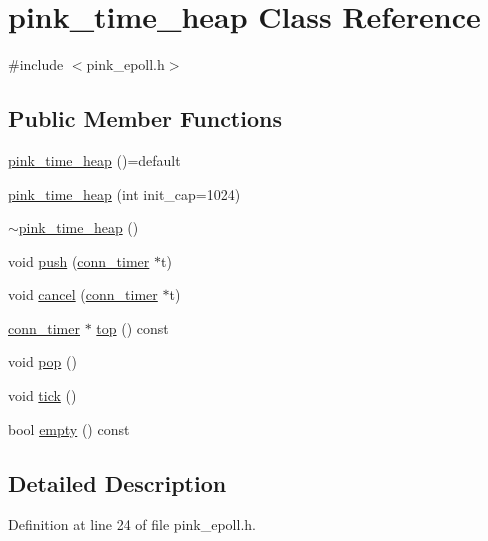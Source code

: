 \hypertarget{classpink__time__heap}{}\section{pink\+\_\+time\+\_\+heap Class Reference}
\label{classpink__time__heap}


{\ttfamily \#include $<$pink\+\_\+epoll.\+h$>$}

\subsection*{Public Member Functions}
\begin{DoxyCompactItemize}
\item 
\hyperlink{classpink__time__heap_a72c02a943378fc5573ba55c614fc4b8d}{pink\+\_\+time\+\_\+heap} ()=default
\item 
\hyperlink{classpink__time__heap_a45279534f708648c2f51d166fe0a376a}{pink\+\_\+time\+\_\+heap} (int init\+\_\+cap=1024)
\item 
\hyperlink{classpink__time__heap_a6aed9951c6c206e7752fa304d8fec612}{$\sim$pink\+\_\+time\+\_\+heap} ()
\item 
void \hyperlink{classpink__time__heap_aa74cc12fe4a94acbe75b70a3962a862f}{push} (\hyperlink{classconn__timer}{conn\+\_\+timer} $\ast$t)
\item 
void \hyperlink{classpink__time__heap_a331d1f993efc7bd50f8e6d10e5f1c6ee}{cancel} (\hyperlink{classconn__timer}{conn\+\_\+timer} $\ast$t)
\item 
\hyperlink{classconn__timer}{conn\+\_\+timer} $\ast$ \hyperlink{classpink__time__heap_ac0932b13390241373290a321ecf16600}{top} () const
\item 
void \hyperlink{classpink__time__heap_a5642ee3340cdee7983ed63770e7109d1}{pop} ()
\item 
void \hyperlink{classpink__time__heap_a9193dc948c6bb00005bf6639f2169b57}{tick} ()
\item 
bool \hyperlink{classpink__time__heap_ade64cf32193747380cb57c5709e28383}{empty} () const
\end{DoxyCompactItemize}


\subsection{Detailed Description}


Definition at line 24 of file pink\+\_\+epoll.\+h.



